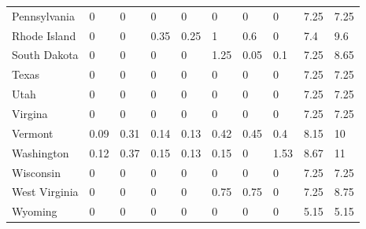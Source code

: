 \begin{table}[H]
{{\begin{tabular}{@{}llllllllll@{}}
            Pennsylvania   & 0    & 0    & 0     & 0    & 0    & 0    & 0    & 7.25     & 7.25   \\
            Rhode Island   & 0    & 0    & 0.35  & 0.25 & 1    & 0.6  & 0    & 7.4      & 9.6    \\
            South Dakota   & 0    & 0    & 0     & 0    & 1.25 & 0.05 & 0.1  & 7.25     & 8.65   \\
            Texas          & 0    & 0    & 0     & 0    & 0    & 0    & 0    & 7.25     & 7.25   \\
            Utah           & 0    & 0    & 0     & 0    & 0    & 0    & 0    & 7.25     & 7.25   \\
            Virgina        & 0    & 0    & 0     & 0    & 0    & 0    & 0    & 7.25     & 7.25   \\
            Vermont        & 0.09 & 0.31 & 0.14  & 0.13 & 0.42 & 0.45 & 0.4  & 8.15     & 10     \\
            Washington     & 0.12 & 0.37 & 0.15  & 0.13 & 0.15 & 0    & 1.53 & 8.67     & 11     \\
            Wisconsin      & 0    & 0    & 0     & 0    & 0    & 0    & 0    & 7.25     & 7.25   \\
            West Virginia  & 0    & 0    & 0     & 0    & 0.75 & 0.75 & 0    & 7.25     & 8.75   \\
            Wyoming        & 0    & 0    & 0     & 0    & 0    & 0    & 0    & 5.15     & 5.15   \\ \bottomrule\bottomrule
        \end{tabular}%
    }
    }

\end{table}